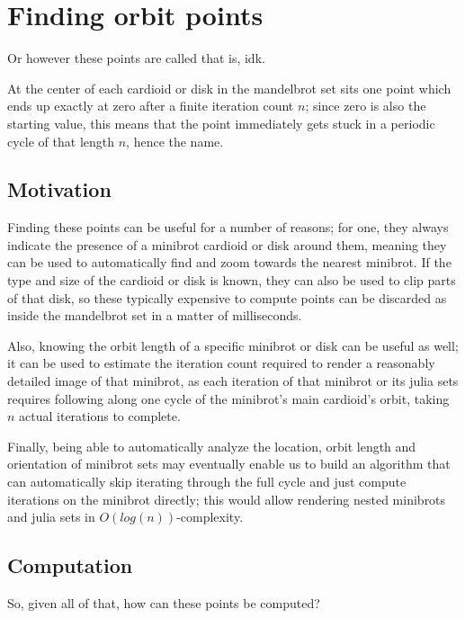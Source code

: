 \documentclass[12pt,a4paper]{article}
\begin{document}
	
\section{Finding orbit points}

Or however these points are called that is, idk.

At the center of each cardioid or disk in the mandelbrot set sits one point which ends up exactly at zero after a finite iteration count $n$; since zero is also the starting value, this means that the point immediately gets stuck in a periodic cycle of that length $n$, hence the name.

\subsection{Motivation}

Finding these points can be useful for a number of reasons; for one, they always indicate the presence of a minibrot cardioid or disk around them, meaning they can be used to automatically find and zoom towards the nearest minibrot. If the type and size of the cardioid or disk is known, they can also be used to clip parts of that disk, so these typically expensive to compute points can be discarded as inside the mandelbrot set in a matter of milliseconds.

Also, knowing the orbit length of a specific minibrot or disk can be useful as well; it can be used to estimate the iteration count required to render a reasonably detailed image of that minibrot, as each iteration of that minibrot or its julia sets requires following along one cycle of the minibrot's main cardioid's orbit, taking $n$ actual iterations to complete.

Finally, being able to automatically analyze the location, orbit length and orientation of minibrot sets may eventually enable us to build an algorithm that can automatically skip iterating through the full cycle and just compute iterations on the minibrot directly; this would allow rendering nested minibrots and julia sets in $O(log(n))$-complexity.

\subsection{Computation}

So, given all of that, how can these points be computed?
\end{document}
